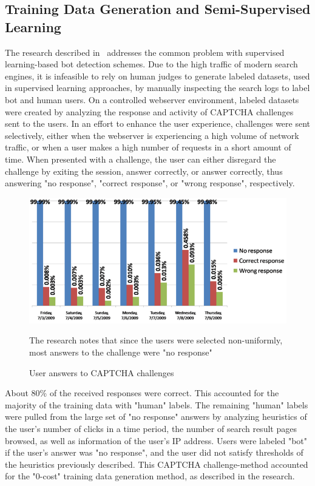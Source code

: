 \subsection{Training Data Generation and Semi-Supervised Learning}\label{subsec:training-data-generation-and-semi-supervised-learning}
The research described in~\cite{bot_detection_for_search_engines} addresses the common problem with supervised learning-based bot detection schemes.
Due to the high traffic of modern search engines, it is infeasible to rely on human judges to generate labeled datasets, used in supervised learning approaches, by manually inspecting the search logs to label bot and human users.
On a controlled webserver environment, labeled datasets were created by analyzing the response and activity of CAPTCHA challenges sent to the users.
In an effort to enhance the user experience, challenges were sent selectively, either when the webserver is experiencing a high volume of network traffic, or when a user makes a high number of requests in a short amount of time.
When presented with a challenge, the user can either disregard the challenge by exiting the session, answer correctly, or answer correctly, thus answering "no response", "correct response", or "wrong response", respectively.
\begin{figure}[!h]
    \centering
    \includegraphics[width=1\columnwidth]{figures/semi_supervised_CAPTCHA_training_data_generation_results}
    \caption{User answers to CAPTCHA challenges}
    \label{fig:captcha-user-answers}
    {\small The research notes that since the users were selected non-uniformly, most answers to the challenge were "no response"}
\end{figure}
About 80\% of the received responses were correct.
This accounted for the majority of the training data with "human" labels.
The remaining "human" labels were pulled from the large set of "no response" answers by analyzing heuristics of the user's number of clicks in a time period, the number of search result pages browsed, as well as information of the user's IP address.
Users were labeled "bot" if the user's answer was "no response", and the user did not satisfy thresholds of the heuristics previously described.
This CAPTCHA challenge-method accounted for the "0-cost" training data generation method, as described in the research.

